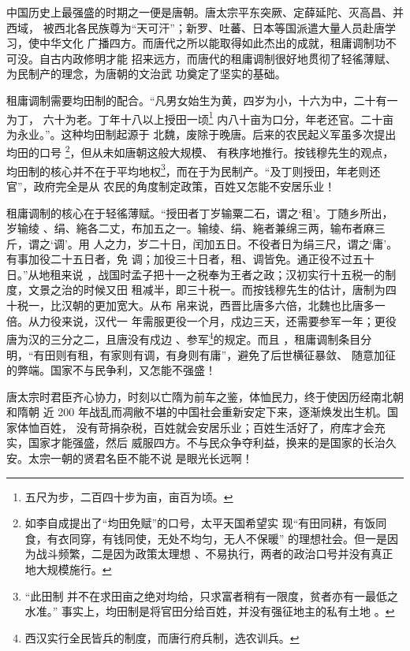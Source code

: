 中国历史上最强盛的时期之一便是唐朝。唐太宗平东突厥、定薛延陀、灭高昌、并西域，
被西北各民族尊为“天可汗”；新罗、吐蕃、日本等国派遣大量人员赴唐学习，使中华文化
广播四方。而唐代之所以能取得如此杰出的成就，租庸调制功不可没。自古内政修明才能
招来远方，而唐代的租庸调制很好地贯彻了轻徭薄赋、为民制产的理念，为唐朝的文治武
功奠定了坚实的基础。

租庸调制需要均田制的配合。“凡男女始生为黄，四岁为小，十六为中，二十有一为丁，
六十为老。丁年十八以上授田一顷\footnote{五尺为步，二百四十步为亩，亩百为顷。}
内八十亩为口分，年老还官。二十亩为永业。”\parencite{qianmu}。这种均田制起源于
北魏，废除于晚唐。\parencite{wkpd-jtz}后来的农民起义军虽多次提出均田的口号
\footnote{如李自成提出了“均田免赋”\parencite{bdbk-jtmf}的口号，太平天国希望实
    现“有田同耕，有饭同食，有衣同穿，有钱同使，无处不均匀，无人不保暖”
    \parencite{wkpd-tctmzd}的理想社会。但一是因为战斗频繁，二是因为政策太理想
、不易执行，两者的政治口号并没有真正地大规模施行。}，但从未如唐朝这般大规模、
有秩序地推行。按钱穆先生的观点，均田制的核心并不在于平均地权\footnote{“此田制
    并不在求田亩之绝对均给，只求富者稍有一限度，贫者亦有一最低之水准。”
    \parencite{qianmu}事实上，均田制是将官田分给百姓，并没有强征地主的私有土地
。}，而在于为民制产。“及丁则授田，年老则还官”\parencite{qianmu}，政府完全是从
农民的角度制定政策，百姓又怎能不安居乐业！

租庸调制的核心在于轻徭薄赋。“授田者丁岁输粟二石，谓之‘租’。丁随乡所出，岁输绫
、绢、絁各二丈，布加五之一。输绫、绢、絁者兼绵三两，输布者麻三斤，谓之‘调’。用
人之力，岁二十日，闰加五日。不役者日为绢三尺，谓之‘庸’。有事加役二十五日者，免
调；加役三十日者，租、调皆免。通正役不过五十日。”\parencite{qianmu}从地租来说
，战国时孟子把十一之税奉为王者之政；汉初实行十五税一的制度，文景之治的时候又田
租减半，即三十税一。而按钱穆先生的估计，唐制为四十税一，比汉朝的更加宽大。从布
帛来说，西晋比唐多六倍，北魏也比唐多一倍。\parencite{qianmu}从力役来说，汉代一
年需服更役一个月，戍边三天，还需要参军一年；更役唐为汉的三分之二，且唐没有戍边
、参军\footnote{西汉实行全民皆兵的制度，而唐行府兵制，选农训兵。}的规定。而且
，租庸调制条目分明，“有田则有租，有家则有调，有身则有庸”，避免了后世横征暴敛、
随意加征的弊端。国家不与民争利，又怎能不强盛！

唐太宗时君臣齐心协力，时刻以亡隋为前车之鉴，体恤民力，终于使因历经南北朝和隋朝
近 200 年战乱而凋敝不堪的中国社会重新安定下来，逐渐焕发出生机。国家体恤百姓，
没有苛捐杂税，百姓就会安居乐业；百姓生活好了，府库才会充实，国家才能强盛，然后
威服四方。不与民众争夺利益，换来的是国家的长治久安。太宗一朝的贤君名臣不能不说
是眼光长远啊！

